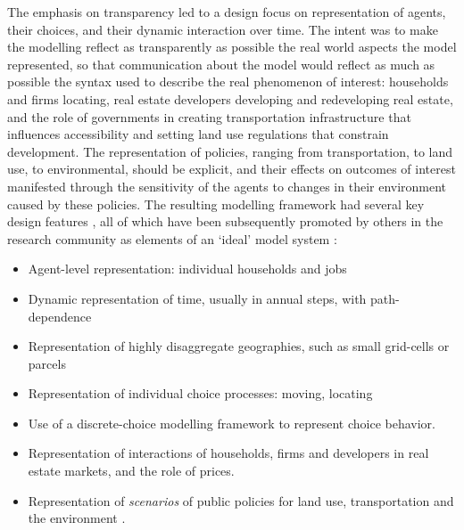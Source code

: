 \documentclass[12pt,a4paper]{article}
\begin{document}
The emphasis on transparency led to a design focus on
representation of agents, their choices, and their dynamic
interaction over time. The intent was to make the modelling
reflect as transparently as possible the real world aspects the
model represented, so that communication about the model would
reflect as much as possible the syntax used to describe the real
phenomenon of interest: households and firms locating, real estate
developers developing and redeveloping real estate, and the role
of governments in creating transportation infrastructure that
influences accessibility and setting land use regulations that
constrain development.  The representation of policies, ranging
from transportation, to land use, to environmental, should be
explicit, and their effects on outcomes of interest manifested
through the sensitivity of the agents to changes in their
environment caused by these policies.  The resulting modelling
framework had several key design features
\cite{waddell-env-and-planning-2000,waddell-japa-2002}, all of
which have been subsequently promoted by others in the research
community as elements of an `ideal' model system
\cite{miller-tcrp-1999}:


\begin{itemize}

\item Agent-level representation: individual households and jobs

\item Dynamic representation of time, usually in annual steps,
with path-dependence

\item Representation of highly disaggregate geographies, such as
small grid-cells or parcels

\item Representation of individual choice processes: moving,
locating

\item Use of a discrete-choice modelling framework to represent
choice behavior.

\item Representation of interactions of households, firms and
developers in real estate markets, and the role of prices.

\item Representation of \emph{scenarios} of public policies for
land use, transportation and the environment .

\end{itemize}
\end{document}
